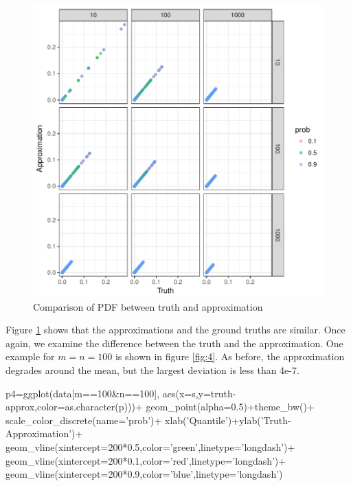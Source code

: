\begin{figure}[h]
\includegraphics[width=\textwidth]{truth_vs_approximation_pdf.pdf}
\caption{Comparison of PDF between truth and approximation}
\label{fig:3}
\end{figure}

Figure \ref{fig:3} shows that the approximations and the ground truths are similar. Once again, we examine the difference between the truth and the approximation. One example for $m=n=100$ is shown in figure \ref{fig:4}. As before, the approximation degrades around the mean, but the largest deviation is less than 4e-7.


\begin{example}
p4=ggplot(data[m==100&n==100],
	aes(x=s,y=truth-approx,color=as.character(p)))+
	geom_point(alpha=0.5)+theme_bw()+
	scale_color_discrete(name='prob')+
	xlab('Quantile')+ylab('Truth-Approximation')+
	geom_vline(xintercept=200*0.5,color='green',linetype='longdash')+
	geom_vline(xintercept=200*0.1,color='red',linetype='longdash')+
	geom_vline(xintercept=200*0.9,color='blue',linetype='longdash')
\end{example}

